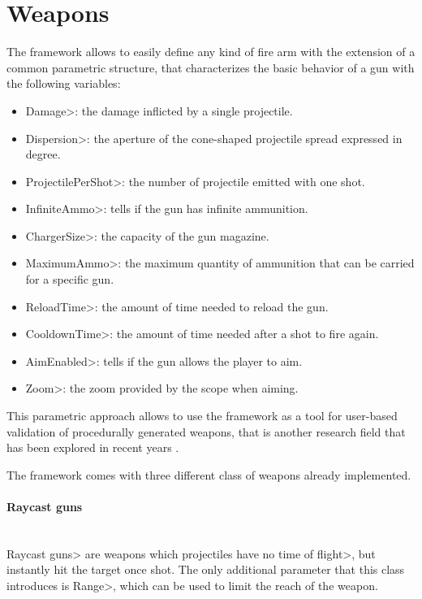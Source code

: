
\section{Weapons}

The framework allows to easily define any kind of fire arm with the extension of a common parametric structure, that characterizes the basic behavior of a gun with the following variables: 

\begin{itemize}
\item \<Damage>: the damage inflicted by a single projectile.
\item \<Dispersion>: the aperture of the cone-shaped projectile spread expressed in degree.
\item \<ProjectilePerShot>: the number of projectile emitted with one shot.
\item \<InfiniteAmmo>: tells if the gun has infinite ammunition.
\item \<ChargerSize>: the capacity of the gun magazine.
\item \<MaximumAmmo>: the maximum quantity of ammunition that can be carried for a specific gun.
\item \<ReloadTime>: the amount of time needed to reload the gun.
\item \<CooldownTime>:  the amount of time needed after a shot to fire again.
\item \<AimEnabled>: tells if the gun allows the player to aim.
\item \<Zoom>: the zoom provided by the scope when aiming.
\end{itemize}

\noindent This parametric approach allows to use the framework as a tool for user-based validation of procedurally generated weapons, that is another research field that has been explored in recent years \cite{ArmiProcedurali}.

\par 

The framework comes with three different class of weapons already implemented.

\paragraph{Raycast guns}

\mbox{}\\

{\setlength{\parindent}{0cm}
\<Raycast guns> are weapons which projectiles have no \<time of flight>, but instantly hit the target once shot. The only additional parameter that this class introduces is \<Range>, which can be used to limit the reach of the weapon.
}

